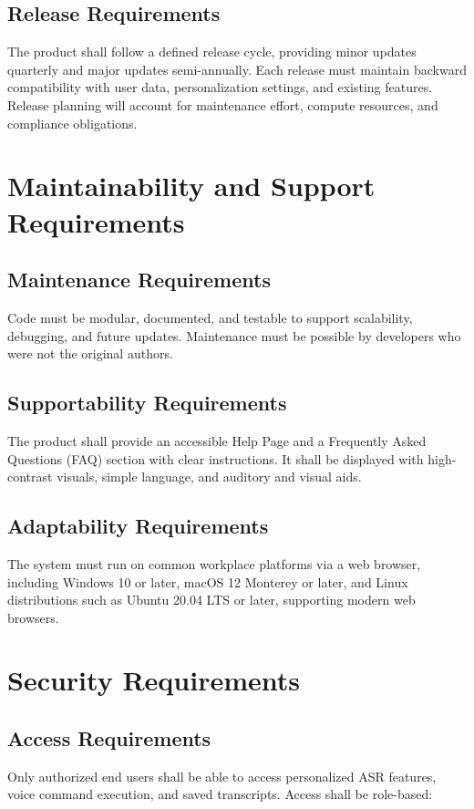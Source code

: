 \documentclass[11pt]{article}
\begin{document}
\subsection{Release Requirements}
The product shall follow a defined release cycle, providing minor updates quarterly and major updates semi-annually. Each release must maintain backward compatibility with user data, personalization settings, and existing features. Release planning will account for maintenance effort, compute resources, and compliance obligations.

\section{Maintainability and Support Requirements}
\subsection{Maintenance Requirements}
Code must be modular, documented, and testable to support scalability, debugging, and future updates. Maintenance must be possible by developers who were not the original authors. 
\subsection{Supportability Requirements}
The product shall provide an accessible Help Page and a Frequently Asked Questions (FAQ) section with clear instructions. It shall be displayed with high-contrast visuals, simple language, and auditory and visual aids. 
\subsection{Adaptability Requirements}
The system must run on common workplace platforms via a web browser, including Windows 10 or later, macOS 12 Monterey or later, and Linux distributions such as Ubuntu 20.04 LTS or later, supporting modern web browsers.

\section{Security Requirements}
\subsection{Access Requirements}
Only authorized end users shall be able to access personalized ASR features, voice command execution, and saved transcripts. Access shall be role-based:
\end{document}
